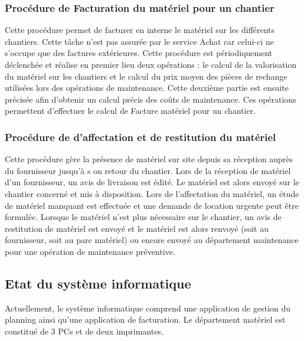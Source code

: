 	\subsubsection{Procédure de Facturation du matériel pour un chantier}
Cette procédure permet de facturer en interne le matériel sur les différents chantiers. Cette tâche n’est pas assurée par le service Achat car celui-ci ne s’occupe que des factures extérieures.
Cette procédure est périodiquement déclenchée et réalise en premier lieu deux opérations : le calcul de la valorisation du matériel sur les chantiers et le calcul du prix moyen des pièces de rechange utilisées lors des opérations de maintenance. Cette deuxième partie est ensuite précisée afin d’obtenir un calcul précis des coûts de maintenance.
Ces opérations permettent d’effectuer le calcul de Facture matériel pour un chantier.

		
	\subsubsection{Procédure de d’affectation et de restitution du matériel}
Cette procédure gère la présence de matériel sur site depuis sa réception auprès du fournisseur jusqu’à s on retour du chantier.
Lors de la réception  de matériel d’un fournisseur, un avis de livraison est édité. Le matériel est alors envoyé sur le chantier concerné et mis à disposition.
Lors de l’affectation du matériel, un étude de matériel manquant est effectuée et une demande de location urgente peut être formulée. 
Lorsque le matériel n’est plus nécessaire sur le chantier, un avis de restitution de matériel est envoyé et le matériel 
est alors renvoyé (soit au fournisseur, soit au parc matériel) ou encore envoyé au département maintenance pour une opération de maintenance préventive.

\subsection{Etat du système informatique}
Actuellement, le système informatique comprend une application de gestion du planning ainsi qu’une application de facturation.
Le département matériel est constitué de 3 PCs et de deux imprimantes.

